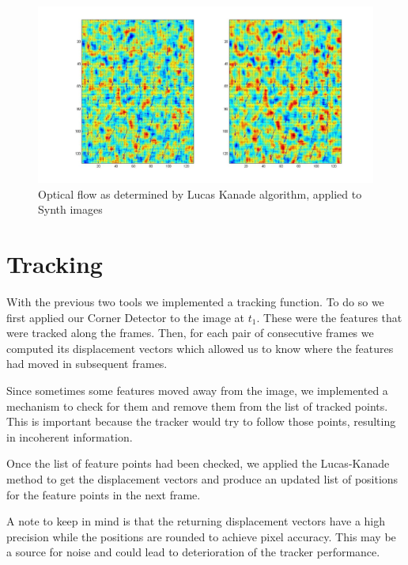 \documentclass[11pt]{article}
\begin{document}
\begin{figure}[H] \centering
	\includegraphics[width=.8\textwidth]{imgs/synth.jpg}
	\caption{Optical flow as determined by Lucas Kanade algorithm, applied to Synth images}
	\label{fig:synth_lucas}
\end{figure}


\section{Tracking}
With the previous two tools we implemented a tracking function. To do so we first applied our Corner Detector to the image at $t_1$. These were the features that were tracked along the frames.  Then, for each pair of consecutive frames we computed its displacement vectors which allowed us to know where the features had moved in subsequent frames. 

Since sometimes some features moved away from the image, we implemented a mechanism to check for them and remove them from the list of tracked points. This is important because the tracker would try to follow those points, resulting in incoherent information.

Once the list of feature points had been checked, we applied the Lucas-Kanade method to get the displacement vectors and produce an updated list of positions for the feature points in the next frame. 

A note to keep in mind is that the returning displacement vectors have a high precision while the positions are rounded to achieve pixel accuracy. This may be a source for noise and could lead to deterioration of the tracker performance.
\end{document}
